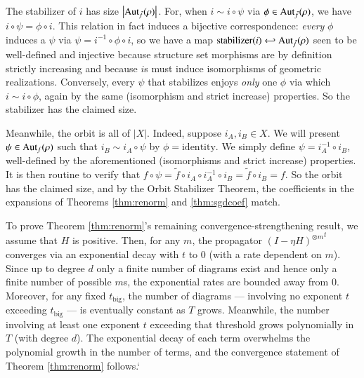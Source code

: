 \documentclass{article}
\theoremstyle{plain}
\theoremstyle{definition}
\newcommand{\wabs}[1]{\left|#1\right|}
\newcommand{\Aut}{\text{\textnormal{Aut}}}
\begin{document}
            The stabilizer of $i$ has size $\wabs{\Aut_{\tilde f}(\rho)}$.
            For, when $i \sim i \circ \psi$ via $\phi \in \Aut_{\tilde
            f}(\rho)$, we have $i\circ \psi = \phi \circ i$.  This relation in
            fact induces a bijective correspondence: \emph{every} $\phi$
            induces a $\psi$ via $\psi = i^{-1} \circ \phi \circ i$, so we have
            a map $\text{stabilizer}(i) \hookleftarrow \Aut_{\tilde f}(\rho)$
            seen to be well-defined and injective because structure set
            morphisms are by definition strictly increasing and because $i$s
            must induce isomorphisms of geometric realizations.  Conversely,
            every $\psi$ that stabilizes enjoys \emph{only} one $\phi$ via
            which $i \sim i \circ \phi$, again by the same (isomorphism and
            strict increase) properties.  So the stabilizer has the claimed
            size.

            Meanwhile, the orbit is all of $\wabs{X}$.  Indeed, suppose $i_A,
            i_B \in X$.  We will present $\psi \in \Aut_f(\rho)$ such that $i_B
            \sim i_A \circ \psi$ by $\phi=\text{identity}$.  We simply define
            $\psi = i_A^{-1} \circ i_B$, well-defined by the aforementioned
            (isomorphisms and strict increase) properties.  It is then routine
            to verify that
            $
                f \circ \psi
                =
                \tilde f \circ i_A \circ i_A^{-1} \circ i_B
                =
                \tilde f \circ i_B
                = f.
            $
            So the orbit has the claimed size, and by the Orbit Stabilizer
            Theorem, the coefficients in the expansions of Theorems 
            \ref{thm:renorm} and \ref{thm:sgdcoef} match.

            To prove Theorem \ref{thm:renorm}'s remaining
            convergence-strengthening result, we assume that $H$ is positive.
            Then, for any $m$, the propagator ${(I-\eta H)^{\otimes m}}^t$
            converges via an exponential decay with $t$ to $0$ (with a rate
            dependent on $m$).  Since up to degree $d$ only a finite number of
            diagrams exist and hence only a finite number of possible $m$s, the
            exponential rates are bounded away from $0$.  Moreover, for any
            fixed $t_{\text{big}}$, the number of diagrams --- involving no
            exponent $t$ exceeding $t_{\text{big}}$ --- is eventually constant
            as $T$ grows.  Meanwhile, the number involving at least one
            exponent $t$ exceeding that threshold grows polynomially in $T$
            (with degree $d$).  The exponential decay of each term overwhelms
            the polynomial growth in the number of terms, and the convergence
            statement of Theorem \ref{thm:renorm} follows.`
\end{document}
